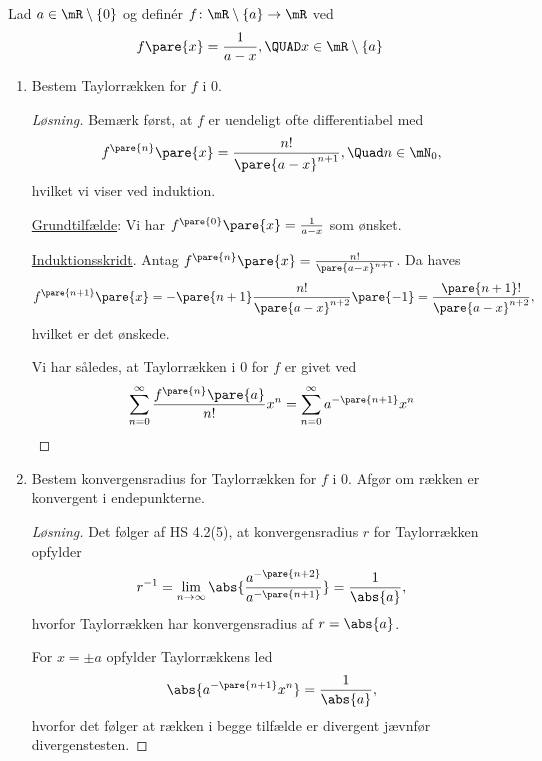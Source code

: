 \begin{opg}
Lad $a\in\mR\setminus\{0\}$ og definér $f\colon\mR\setminus\{a\}\to\mR$ ved
$$ f\pare{x}
    = \frac{1}{a-x}, \QUAD x\in \mR\setminus\{a\} $$
\begin{enumerate}
    \item Bestem Taylorrækken for $f$ i $0$.
    
    
    \begin{proof}[Løsning]
    Bemærk først, at $f$ er uendeligt ofte differentiabel med 
    $$ f^{\pare{n}}\pare{x} = \frac{n!}{\pare{a-x}^{n+1}},
        \Quad n\in\mN_0, $$
    hvilket vi viser ved induktion.
    
    \begin{indent}
    \underline{Grundtilfælde}: Vi har $f^{\pare{0}}\pare{x}=\frac{1}{a-x}$ som ønsket.
    
    \underline{Induktionsskridt}. Antag $f^{\pare{n}}\pare{x} = \frac{n!}{\pare{a-x}^{n+1}}$. Da haves
    $$ f^{\pare{n+1}}\pare{x} = -\pare{n+1}\frac{n!}{\pare{a-x}^{n+2}}\pare{-1} = \frac{\pare{n+1}!}{\pare{a-x}^{n+2}}, $$
    hvilket er det ønskede.
    \end{indent}
    Vi har således, at Taylorrækken i $0$ for $f$ er givet ved
    $$ \sum_{n=0}^\infty \frac{f^{\pare{n}}\pare{a}}{n!}x^n
        = \sum_{n=0}^\infty a^{-\pare{n+1}}x^n $$
    \end{proof}
    
    
    \item Bestem konvergensradius for Taylorrækken for $f$ i $0$. Afgør om rækken er konvergent i endepunkterne.
    
    
    \begin{proof}[Løsning]
    Det følger af HS 4.2(5), at konvergensradius $r$ for Taylorrækken opfylder
    $$ r^{-1} = \lim_{n\to\infty} 
        \abs{\frac{a^{-\pare{n+2}}}{a^{-\pare{n+1}}}}
        = \frac{1}{\abs{a}}, $$
    hvorfor Taylorrækken har konvergensradius af $r = \abs{a}$. 
    
    For $x = \pm a$ opfylder Taylorrækkens led
    $$ \abs{a^{-\pare{n+1}}x^n} = \frac{1}{\abs{a}}, $$
    hvorfor det følger at rækken i begge tilfælde er divergent jævnfør divergenstesten.
    \end{proof}
    
\end{enumerate}
\end{opg}

